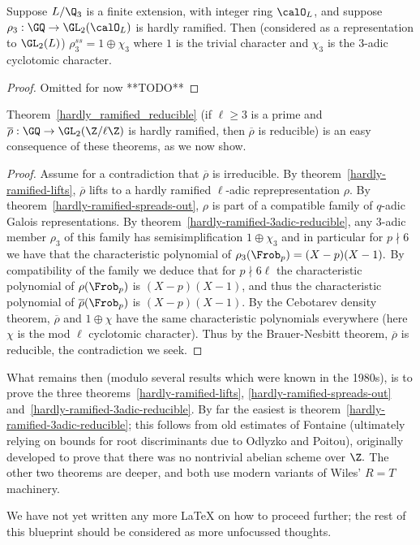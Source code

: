 \begin{theorem}
  \label{hardly-ramified-3adic-reducible}
  Suppose $L/\Q_3$ is a finite extension, with integer ring $\calO_L$, and suppose
  $\rho_3:\GQ\to\GL_2(\calO_L)$ is hardly ramified. Then (considered as a representation
  to $\GL_2(L)$) $\rho_3^{ss}=1\oplus\chi_3$
  where $1$ is the trivial character and $\chi_3$ is the 3-adic cyclotomic character.
\end{theorem}
\begin{proof}
  Omitted for now **TODO**
\end{proof}

Theorem~\ref{hardly_ramified_reducible} (if $\ell\geq 3$ is a prime and
$\overline{\rho}:\GQ\to\GL_2(\Z/\ell\Z)$ is hardly ramified,
then $\overline{\rho}$ is reducible) is an easy consequence of these theorems,
as we now show.

\begin{proof}
  Assume for a contradiction that $\overline{\rho}$ is irreducible. By theorem~\ref{hardly-ramified-lifts},
  $\overline{\rho}$ lifts to a hardly ramified $\ell$-adic reprepresentation $\rho$. By
  theorem~\ref{hardly-ramified-spreads-out}, $\rho$ is part of a compatible family of
  $q$-adic Galois representations. By theorem~\ref{hardly-ramified-3adic-reducible},
  any 3-adic member $\rho_3$ of this family has semisimplification $1\oplus\chi_3$ and in particular
  for $p\nmid 6$ we have that the characteristic polynomial of $\rho_3(\Frob_p)=(X-p)(X-1).$
  By compatibility of the family we deduce that for $p\nmid 6\ell$ the characteristic
  polynomial of $\rho(\Frob_p)$ is $(X-p)(X-1)$, and thus the characteristic polynomial
  of $\overline{\rho}(\Frob_p)$ is $(X-p)(X-1)$. By the Cebotarev density theorem,
  $\overline{\rho}$ and $1\oplus\chi$ have the same characteristic polynomials everywhere
  (here $\chi$ is the mod $\ell$ cyclotomic character). Thus by the Brauer-Nesbitt theorem,
  $\overline{\rho}$ is reducible, the contradiction we seek.
\end{proof}

What remains then (modulo several results which were known in the 1980s),
is to prove the three theorems~\ref{hardly-ramified-lifts},
\ref{hardly-ramified-spreads-out} and~\ref{hardly-ramified-3adic-reducible}.
By far the easiest is theorem~\ref{hardly-ramified-3adic-reducible}; this follows
from old estimates of Fontaine (ultimately relying on bounds for root discriminants due to
Odlyzko and Poitou), originally developed to prove that there was no
nontrivial abelian scheme over $\Z.$ The other two theorems are deeper, and both use
modern variants of Wiles' $R=T$ machinery.

We have not yet written any more LaTeX on how to proceed further; the rest of
this blueprint should be considered as more unfocussed thoughts.

